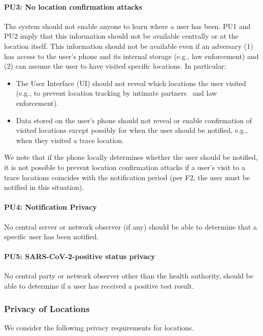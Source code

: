 \paragraph{PU3: No location confirmation attacks} The system should not enable anyone to learn where a user has been. 
PU1 and PU2 imply that this information should not be available centrally or at the location itself. This information should not be available even if an adversary (1) has access to the user's phone and its internal storage (e.g., law enforcement)
and (2) can assume the user to have visited specific locations. In particular:
\begin{itemize}[topsep=0pt, partopsep=0pt]
\item The User Interface (UI) should not reveal which locations the user visited (e.g., to prevent location tracking by intimate partners~\cite{ChatterjeeDOHPF18,FreedPMLRD18,LevyS20} and law enforcement).
 \item Data stored on the user's phone should not reveal or enable confirmation of visited locations except possibly for when the user should be notified, e.g., when they visited a trace location.
\end{itemize}
We note that if the phone locally determines whether the user should be notified, it is not possible to prevent location confirmation attacks if a user's visit to a trace locations coincides with the notification period (per F2, the user must be notified in this situation).

\paragraph{PU4: Notification Privacy} No central server or network observer (if any) should be able to determine that a specific user has been notified.

\paragraph{PU5: SARS-CoV-2-positive status privacy} No central party or network observer other than the health authority, should be able to determine if a user has received a positive test result.

\subsubsection{Privacy of Locations}
We consider the following privacy requirements for locations.

